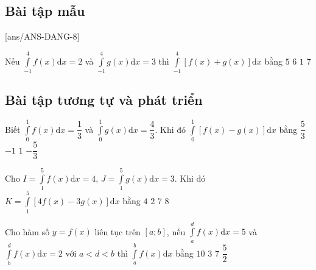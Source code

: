 \subsection{Bài tập mẫu}
[ans/ANS-DANG-8]
\begin{khung}%
	\begin{vd}
		Nếu $ \displaystyle\int\limits_{-1}^{4} f(x)\mathrm{d}x=2 $ và $ \displaystyle\int\limits_{-1}^{4} g(x)\mathrm{d}x=3 $ thì $ \displaystyle\int\limits_{-1}^{4} \left[f(x)+g(x)\right]\mathrm{d}x $ bằng
		\choice
		{\True $ 5 $}
		{$ 6 $}
		{$ 1 $}
		{$ 7 $}
	\end{vd}
\end{khung}

\subsection{Bài tập tương tự và phát triển}
\begin{ex}%
Biết $ \displaystyle \int\limits_{0}^{1}f(x)\mathrm{d}x =\dfrac{1}{3} $ và $ \displaystyle \int\limits_{0}^{1}g(x)\mathrm{d}x =\dfrac{4}{3} $. Khi đó $ \displaystyle \int\limits_{0}^{1}\left[f(x)-g(x)\right]\mathrm{d}x $ bằng
\choice
{$ \dfrac{5}{3} $}
{\True $ -1 $}
{$ 1 $}
{$ -\dfrac{5}{3} $}
\end{ex}

\begin{ex}%
Cho $ I=\displaystyle \int\limits_{1}^{5} f(x)\mathrm{d}x=4$, $ J=\displaystyle \int\limits_{1}^{5}g(x)\mathrm{d}x=3 $. Khi đó $ K=\displaystyle \int\limits_{1}^{5}\left[4f(x)-3g(x)\right]\mathrm{d}x $ bằng
\choice
{$ 4 $}
{$ 2 $}
{\True $ 7 $}
{$ 8 $}
\end{ex}

\begin{ex}%
Cho hàm số $ y=f(x) $ liên tục trên $ [a;b] $, nếu $ \displaystyle \int\limits_{a}^{d}f(x)\mathrm{d}x=5 $ và $ \displaystyle \int\limits_{b}^{d}f(x)\mathrm{d}x=2 $ với $ a<d<b $ thì $ \displaystyle \int\limits_{a}^{b}f(x)\mathrm{d}x $ bằng
\choice
{$ 10 $}
{\True$ 3 $}
{$ 7 $}
{$ \dfrac{5}{2} $}
\end{ex}

